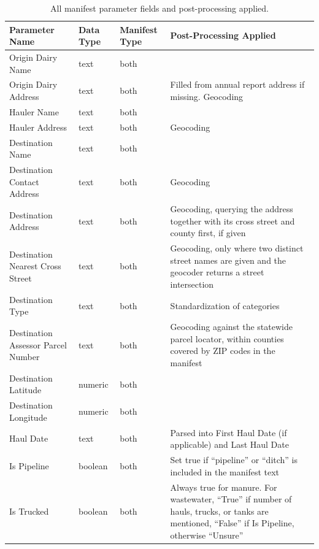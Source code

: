 
\begin{longtable}{| >{\raggedright\arraybackslash}p{4.4cm} | >{\raggedright\arraybackslash}p{1.6cm} | >{\raggedright\arraybackslash}p{1.9cm} | >{\raggedright\arraybackslash}p{5.2cm} |}
\caption{All manifest parameter fields and post-processing applied.} \\
\hline
\textbf{Parameter Name} & \textbf{Data Type} & \textbf{Manifest Type} & \textbf{Post-Processing Applied} \\
\hline
Origin Dairy Name & text & both &  \\
\hline
Origin Dairy Address & text & both & Filled from annual report address if missing. Geocoding \\
\hline
Hauler Name & text & both &  \\
\hline
Hauler Address & text & both & Geocoding \\
\hline
Destination Name & text & both &  \\
\hline
Destination Contact Address & text & both & Geocoding \\
\hline
Destination Address & text & both & Geocoding, querying the address together with its cross street and county first, if given \\
\hline
Destination Nearest Cross Street & text & both & Geocoding, only where two distinct street names are given and the geocoder returns a street intersection \\
\hline
Destination Type & text & both & Standardization of categories \\
\hline
Destination Assessor Parcel Number & text & both & Geocoding against the statewide parcel locator, within counties covered by ZIP codes in the manifest \\
\hline
Destination Latitude & numeric & both &  \\
\hline
Destination Longitude & numeric & both &  \\
\hline
Haul Date & text & both & Parsed into First Haul Date (if applicable) and Last Haul Date \\
\hline
Is Pipeline & boolean & both & Set true if ``pipeline'' or ``ditch'' is included in the manifest text \\
\hline
Is Trucked & boolean & both & Always true for manure. For wastewater, ``True'' if number of hauls, trucks, or tanks are mentioned, ``False'' if Is Pipeline, otherwise ``Unsure'' \\

\end{longtable}
